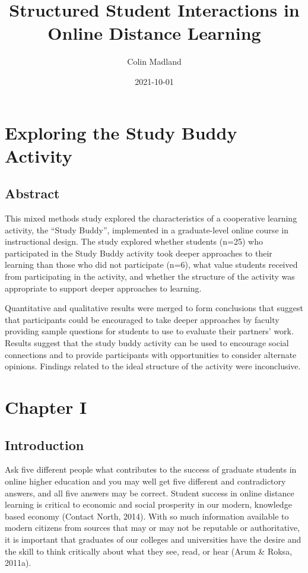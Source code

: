\documentclass[
]{book}
\title{Structured Student Interactions in Online Distance Learning}
\author{Colin Madland}
\date{2021-10-01}
\theoremstyle{definition}
\theoremstyle{definition}
\theoremstyle{definition}
\theoremstyle{definition}
\theoremstyle{remark}
\begin{document}
\maketitle

{
\setcounter{tocdepth}{1}
\tableofcontents
}
\hypertarget{exploring-the-study-buddy-activity}{%
\chapter{Exploring the Study Buddy Activity}\label{exploring-the-study-buddy-activity}}

\hypertarget{abstract}{%
\section{Abstract}\label{abstract}}

This mixed methods study explored the characteristics of a cooperative learning activity, the ``Study Buddy'', implemented in a graduate-level online course in instructional design. The study explored whether students (n=25) who participated in the Study Buddy activity took deeper approaches to their learning than those who did not participate (n=6), what value students received from participating in the activity, and whether the structure of the activity was appropriate to support deeper approaches to learning.

Quantitative and qualitative results were merged to form conclusions that suggest that participants could be encouraged to take deeper approaches by faculty providing sample questions for students to use to evaluate their partners' work. Results suggest that the study buddy activity can be used to encourage social connections and to provide participants with opportunities to consider alternate opinions. Findings related to the ideal structure of the activity were inconclusive.

\hypertarget{chapter-i}{%
\chapter{Chapter I}\label{chapter-i}}

\hypertarget{introduction}{%
\section{Introduction}\label{introduction}}

Ask five different people what contributes to the success of graduate students in online higher education and you may well get five different and contradictory answers, and all five answers may be correct. Student success in online distance learning is critical to economic and social prosperity in our modern, knowledge based economy (Contact North, 2014). With so much information available to modern citizens from sources that may or may not be reputable or authoritative, it is important that graduates of our colleges and universities have the desire and the skill to think critically about what they see, read, or hear (Arum \& Roksa, 2011a).
\end{document}
